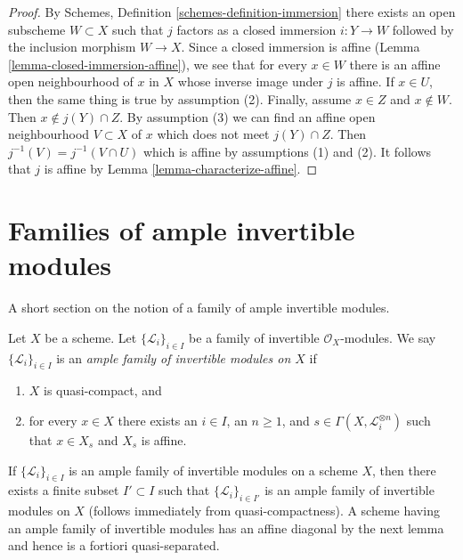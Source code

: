 \begin{proof}
By Schemes, Definition \ref{schemes-definition-immersion} there exists an
open subscheme $W \subset X$ such that $j$ factors as a closed immersion
$i : Y \to W$ followed by the inclusion morphism $W \to X$.
Since a closed immersion is affine
(Lemma \ref{lemma-closed-immersion-affine}),
we see that for every $x \in W$ there is an affine open
neighbourhood of $x$ in $X$ whose inverse image under $j$ is affine.
If $x \in U$, then the same thing is true by assumption (2).
Finally, assume $x \in Z$ and $x \not \in W$. Then $x \not \in j(Y) \cap Z$.
By assumption (3) we can find an affine open neighbourhood
$V \subset X$ of $x$ which does not meet $j(Y) \cap Z$.
Then $j^{-1}(V) = j^{-1}(V \cap U)$ which is affine
by assumptions (1) and (2). It follows that $j$ is affine by
Lemma \ref{lemma-characterize-affine}.
\end{proof}







\section{Families of ample invertible modules}
\label{section-families-ample-invertible-modules}

\noindent
A short section on the notion of a family of ample invertible modules.

\begin{definition}
\label{definition-family-ample-invertible-modules}
\begin{reference}
\cite[II Definition 2.2.4]{SGA6}
\end{reference}
Let $X$ be a scheme. Let $\{\mathcal{L}_i\}_{i \in I}$
be a family of invertible $\mathcal{O}_X$-modules. We say
$\{\mathcal{L}_i\}_{i \in I}$ is an
{\it ample family of invertible modules on $X$} if
\begin{enumerate}
\item $X$ is quasi-compact, and
\item for every $x \in X$ there exists an $i \in I$, an $n \geq 1$,
and $s \in \Gamma(X, \mathcal{L}_i^{\otimes n})$ such
that $x \in X_s$ and $X_s$ is affine.
\end{enumerate}
\end{definition}

\noindent
If $\{\mathcal{L}_i\}_{i \in I}$ is an ample family of invertible
modules on a scheme $X$, then there exists a finite subset $I' \subset I$ such
that $\{\mathcal{L}_i\}_{i \in I'}$ is an ample family of invertible
modules on $X$ (follows immediately from quasi-compactness).
A scheme having an ample family of invertible modules has an affine
diagonal by the next lemma and hence is a fortiori quasi-separated.


